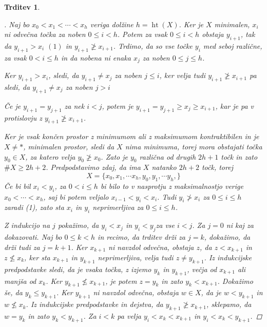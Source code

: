 \documentclass[a4paper,12pt]{article}
\DeclareMathOperator*{\htt}{ht}
\theoremstyle{definition}
\theoremstyle{plain}
\theoremstyle{definition}
\theoremstyle{plain}
\newtheorem{trditev}{Trditev}
\theoremstyle{plain}
\theoremstyle{plain}
\theoremstyle{plain}
\newenvironment{dokaz}{\begin{proof}[\bfseries\upshape\proofname]}{\end{proof}}
\begin{document}
\begin{trditev}
\begin{dokaz}
    Naj bo $x_0<x_1 <\cdots <x_h$ veriga dolžine $h=\htt(X)$. Ker je $X$
     minimalen, $x_i$ ni odvečna točka za noben $0\leq i <h$. Potem za 
     vsak $0\leq i <h$ obstaja $y_{i+1}$, tak da $y_{i+1}> x_i$ $(1)$ in $y_{i+1}
     \ngeq x_{i+1}$. Trdimo, da so vse točke $y_i$ med seboj različne, za vsak
      $0< i \leq h$ in da nobena ni enaka $x_j$ za noben $0\leq j \leq h$.

      Ker $y_{i+1} > x_i$, sledi, da $y_{i+1}\neq x_j$ za noben $j\leq i$, 
      ker velja tudi $y_{i+1}\ngeq x_{i+1}$ pa sledi, da $y_{i+1}\neq x_j$ za 
      noben $j> i$

      Če je $y_{i+1}= y_{j+1}$ za nek $i<j$, potem je $y_{i+1}= y_{j+1}\geq
       x_j \geq x_{i+1}$, kar je pa v protislovju z $y_{i+1} 
       \ngeq x_{i+1}$.

       Ker je vsak končen prostor z minimumom ali z maksimumom kontraktibilen 
       in je $X\neq \ast$, minimalen prostor, sledi da $X$ nima minimuma, 
       torej mora obstajati točka $y_0\in X$, za katero velja $y_0 \ngeq x_0$.
        Zato je $y_0$ različna od drugih $2h+1$ točk in zato $\# X\geq 2h+2$.
        Predpodstavimo zdaj, da ima $X$ natanko $2h+2$ točk, torej 
        $$
        X=\{x_0,x_1,\cdots x_h,y_0,y_1,\cdots y_h,\}
        $$
        Če bi bil $x_i < y_i$, za $0<i\leq h$ bi bilo to v nasprotju z 
        maksimalnostjo verige $x_0 <\cdots <x_h$, saj bi potem veljalo $x_{i-1} 
        < y_i < x_i$. Tudi $y_i \ngtr x_i$ za $0\leq i \leq h$ zaradi (1), zato sta $x_i $ in $y_i$ neprimerljiva za $0\leq i \leq h$.

        Z indukcijo na $j$ pokažimo, da $y_i < x_j$ in $y_i < y_j$za vse $i<j$. Za $j=0$ 
        ni kaj za dokazovati. Naj bo $0\leq k <h$ in recimo, da trditev drži za $j=k$, 
        dokažimo, da drži tudi za $j=k+1$. Ker $x_{k+1}$ ni navzdol odvečna, 
        obstaja $z$, da $z< x_{k+1}$ in $z\nleq x_k$, ker sta $x_{k+1}$ in 
        $y_{k+1}$ neprimerljiva, velja tudi $z\neq y_{k+1}$. Iz indukcijske 
        predpodstavke sledi, da je vsaka točka, z izjemo $y_k$ in $y_{k+1}$, večja 
        od $x_{k+1}$ ali manjša od $x_k$. Ker $y_{k+1} \nleq x_{k+1}$, je potem
        $z=y_k$ in zato $y_k<x_{k+1}$. Dokažimo še, da $y_k\leq y_{k+1}$. Ker 
        $y_{k+1}$ ni navzdol odvečna, obstaja $w\in X$, da je $w<y_{k+1}$ in 
        $w\nleq x_k$. Iz indukcijske predpodstavke
         in dejstva, da $y_{k+1}\ngeq x_{k+1}$, sklepamo,
        da $w=y_k$ in zato $y_k<y_{k+1}$. Za $i<k$ pa velja $y_i<x_k<x_{k+1}$ in
        $y_i<x_k<y_{k+1}$.


\end{dokaz}
\end{trditev}
\end{document}
